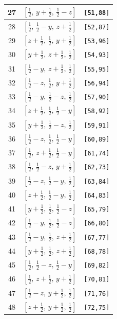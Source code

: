\documentclass[fleqn,8pt]{jsarticle}
\begin{document}
\begin{longtable}{ccc}
27 & $\left[ \frac{1}{2},\, y + \frac{1}{2},\, \frac{1}{2} - z \right]$ & {\tt [51,88]} \\ \hline
28 & $\left[ \frac{1}{2},\, \frac{1}{2} - y,\, z + \frac{1}{2} \right]$ & {\tt [52,87]} \\ \hline
29 & $\left[ z + \frac{1}{2},\, \frac{1}{2},\, y + \frac{1}{2} \right]$ & {\tt [53,96]} \\ \hline
30 & $\left[ y + \frac{1}{2},\, z + \frac{1}{2},\, \frac{1}{2} \right]$ & {\tt [54,93]} \\ \hline
31 & $\left[ \frac{1}{2} - y,\, z + \frac{1}{2},\, \frac{1}{2} \right]$ & {\tt [55,95]} \\ \hline
32 & $\left[ \frac{1}{2} - z,\, \frac{1}{2},\, y + \frac{1}{2} \right]$ & {\tt [56,94]} \\ \hline
33 & $\left[ \frac{1}{2} - y,\, \frac{1}{2} - z,\, \frac{1}{2} \right]$ & {\tt [57,90]} \\ \hline
34 & $\left[ z + \frac{1}{2},\, \frac{1}{2},\, \frac{1}{2} - y \right]$ & {\tt [58,92]} \\ \hline
35 & $\left[ y + \frac{1}{2},\, \frac{1}{2} - z,\, \frac{1}{2} \right]$ & {\tt [59,91]} \\ \hline
36 & $\left[ \frac{1}{2} - z,\, \frac{1}{2},\, \frac{1}{2} - y \right]$ & {\tt [60,89]} \\ \hline
37 & $\left[ \frac{1}{2},\, z + \frac{1}{2},\, \frac{1}{2} - y \right]$ & {\tt [61,74]} \\ \hline
38 & $\left[ \frac{1}{2},\, \frac{1}{2} - z,\, y + \frac{1}{2} \right]$ & {\tt [62,73]} \\ \hline
39 & $\left[ \frac{1}{2} - z,\, \frac{1}{2} - y,\, \frac{1}{2} \right]$ & {\tt [63,84]} \\ \hline
40 & $\left[ z + \frac{1}{2},\, \frac{1}{2} - y,\, \frac{1}{2} \right]$ & {\tt [64,83]} \\ \hline
41 & $\left[ y + \frac{1}{2},\, \frac{1}{2},\, \frac{1}{2} - z \right]$ & {\tt [65,79]} \\ \hline
42 & $\left[ \frac{1}{2} - y,\, \frac{1}{2},\, \frac{1}{2} - z \right]$ & {\tt [66,80]} \\ \hline
43 & $\left[ \frac{1}{2} - y,\, \frac{1}{2},\, z + \frac{1}{2} \right]$ & {\tt [67,77]} \\ \hline
44 & $\left[ y + \frac{1}{2},\, \frac{1}{2},\, z + \frac{1}{2} \right]$ & {\tt [68,78]} \\ \hline
45 & $\left[ \frac{1}{2},\, \frac{1}{2} - z,\, \frac{1}{2} - y \right]$ & {\tt [69,82]} \\ \hline
46 & $\left[ \frac{1}{2},\, z + \frac{1}{2},\, y + \frac{1}{2} \right]$ & {\tt [70,81]} \\ \hline
47 & $\left[ \frac{1}{2} - z,\, y + \frac{1}{2},\, \frac{1}{2} \right]$ & {\tt [71,76]} \\ \hline
48 & $\left[ z + \frac{1}{2},\, y + \frac{1}{2},\, \frac{1}{2} \right]$ & {\tt [72,75]} \\
\end{longtable}
\end{document}
